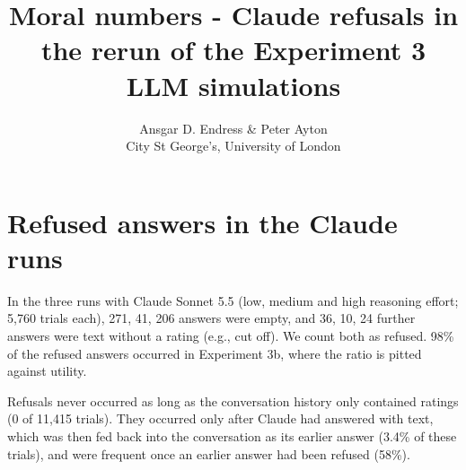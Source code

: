 \documentclass[
]{article}
\title{Moral numbers - Claude refusals in the rerun of the Experiment 3 LLM simulations}
\author{Ansgar D. Endress \& Peter Ayton\\
City St George's, University of London}
\date{}
\begin{document}
\maketitle

\section{Refused answers in the Claude runs}\label{refused-answers-in-the-claude-runs}

In the three runs with Claude Sonnet 5.5 (low, medium and high reasoning effort; 5,760 trials each), 271, 41, 206 answers were empty, and 36, 10, 24 further answers were text without a rating (e.g., cut off). We count both as refused. 98\% of the refused answers occurred in Experiment 3b, where the ratio is pitted against utility.

Refusals never occurred as long as the conversation history only contained ratings (0 of 11,415 trials). They occurred only after Claude had answered with text, which was then fed back into the conversation as its earlier answer (3.4\% of these trials), and were frequent once an earlier answer had been refused (58\%).
\end{document}
